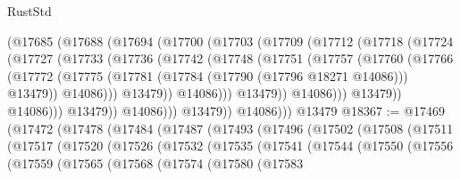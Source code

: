 \begin{lexlean}{RustStd}
\begin{coremodule}
                      (@17685
                        (@17688
                          (@17694
                            (@17700
                              (@17703
                                (@17709
                                  (@17712
                                    (@17718
                                      (@17724
                                        (@17727
                                          (@17733
                                            (@17736
                                              (@17742
                                                (@17748
                                                  (@17751
                                                    (@17757
                                                      (@17760
                                                        (@17766
                                                          (@17772
                                                            (@17775
                                                              (@17781
                                                                (@17784
                                                                  (@17790 (@17796 @18271 @14086)))
                                                                @13479))
                                                            @14086)))
                                                      @13479))
                                                  @14086)))
                                            @13479))
                                        @14086)))
                                  @13479))
                              @14086)))
                        @13479))
                    @14086)))
              @13479))
          @14086)))
    @13479
@18367 := @17469
    (@17472
      (@17478
        (@17484
          (@17487
            (@17493
              (@17496
                (@17502
                  (@17508
                    (@17511
                      (@17517
                        (@17520
                          (@17526
                            (@17532
                              (@17535
                                (@17541
                                  (@17544
                                    (@17550
                                      (@17556
                                        (@17559
                                          (@17565
                                            (@17568
                                              (@17574
                                                (@17580
                                                  (@17583

\end{coremodule}
\end{lexlean}
